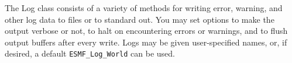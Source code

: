 %


The Log class consists of a variety of methods for writing error, warning, and
other log data to files or to standard out.  You may set options to make 
the output verbose or not, to halt on encountering errors or 
warnings, and to flush output buffers after every write.  Logs may be given
user-specified names, or, if desired, a default {\tt ESMF\_Log\_World} can 
be used.  
